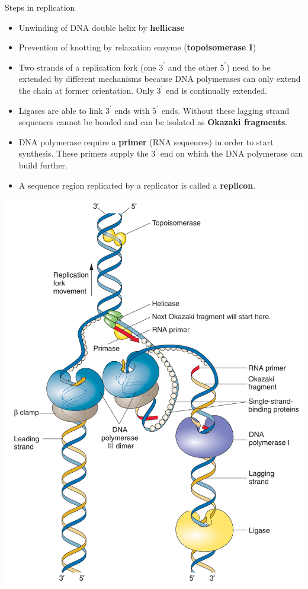 \documentclass[11pt,ignorenonframetext,aspectratio=169]{beamer}
\providecommand{\tightlist}{%
  \setlength{\itemsep}{0pt}\setlength{\parskip}{0pt}}
\begin{document}
\begin{frame}{Steps in replication}
\protect\hypertarget{steps-in-replication}{}

\begin{itemize}
\tightlist
\item
  Unwinding of DNA double helix by \textbf{hellicase}
\item
  Prevention of knotting by relaxation enzyme (\textbf{topoisomerase I})
\item
  Two strands of a replication fork (one \(3^{\prime}\) and the other
  \(5^{\prime}\)) need to be extended by different mechanisms because
  DNA polymerases can only extend the chain at former orientation. Only
  \(3^\prime\) end is continually extended.
\item
  Ligases are able to link \(3^\prime\) ends with \(5^\prime\) ends.
  Without these lagging strand sequences cannot be bonded and can be
  isolated as \textbf{Okazaki fragments}.
\item
  DNA polymerase require a \textbf{primer} (RNA sequences) in order to
  start synthesis. These primers supply the \(3^\prime\) end on which
  the DNA polymerase can build further.
\item
  A sequence region replicated by a replicator is called a
  \textbf{replicon}.
\end{itemize}

\end{frame}

\begin{frame}{}
\protect\hypertarget{section-6}{}

\begin{center}\includegraphics[width=0.45\linewidth]{../images/dna_replication_process} \end{center}

\end{frame}
\end{document}
